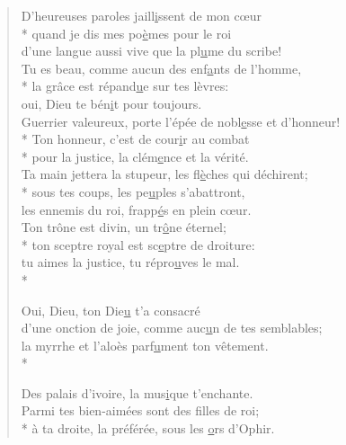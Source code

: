 
\begin{verse}
D’heureuses paroles jaill\underline{i}ssent de mon cœur \\*
quand je dis mes po\underline{è}mes pour le roi \\
d’une langue aussi vive que la pl\underline{u}me du scribe! \\

Tu es beau, comme aucun des enf\underline{a}nts de l’homme, \\*
la grâce est répand\underline{u}e sur tes lèvres: \\
oui, Dieu te bén\underline{i}t pour toujours. \\

Guerrier valeureux, porte l’épée de nobl\underline{e}sse et d’honneur! \\*
Ton honneur, c’est de cour\underline{i}r au combat \\*
pour la justice, la clém\underline{e}nce et la vérité. \\

Ta main jettera la stupeur, les fl\underline{è}ches qui déchirent; \\*
sous tes coups, les pe\underline{u}ples s’abattront, \\
les ennemis du roi, frapp\underline{é}s en plein cœur. \\

Ton trône est divin, un tr\underline{ô}ne éternel; \\*
ton sceptre royal est sc\underline{e}ptre de droiture: \\
tu aimes la justice, tu répro\underline{u}ves le mal. \\*

Oui, Dieu, ton Die\underline{u} t’a consacré \\
d’une onction de joie, comme auc\underline{u}n de tes semblables; \\
la myrrhe et l’aloès parf\underline{u}ment ton vêtement. \\*

Des palais d’ivoire, la mus\underline{i}que t’enchante. \\
Parmi tes bien-aimées sont des f\underline{i}lles de roi; \\*
à ta droite, la préférée, sous les \underline{o}rs d’Ophir. \\


\end{verse}
